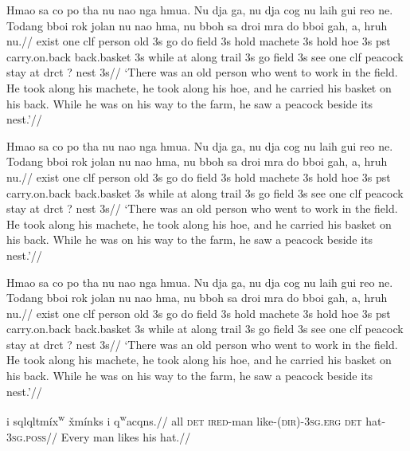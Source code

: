 
\hsize=4in

\raggedbottom
{}


\ex
\begingl
\gla
Hmao sa co po tha  nu nao nga hmua. Nu dja ga, nu dja cog nu laih
gui reo ne. Todang bboi rok jolan nu nao hma, nu bboh sa droi mra
do bboi gah, a, hruh nu.//
\glb
exist one {clf} person old 3s go do field 3s hold machete 3s hold
hoe 3s pst carry.on.back back.basket 3s while at {along} trail 3s
go field 3s see one clf peacock stay at drct {?} nest 3s//
\glft
`There was an old person who went to work in the field. He took
along his machete, he took along his hoe, and he carried his
basket on his back. While he was on his way to the farm, he saw a
peacock beside its nest.'//
\endgl
\xe

\ex
\begingl
\gla
Hmao sa co po tha  nu nao nga hmua. Nu dja ga, nu dja cog nu laih
gui reo ne. Todang bboi rok jolan nu nao hma, nu bboh sa droi mra
do bboi gah, a, hruh nu.//
\glb
exist one {clf} person old 3s go do field 3s hold machete 3s hold
hoe 3s pst carry.on.back back.basket 3s while at {along} trail 3s
go field 3s see one clf peacock stay at drct {?} nest 3s//
\glft
`There was an old person who went to work in the field. He took
along his machete, he took along his hoe, and he carried his
basket on his back. While he was on his way to the farm, he saw a
peacock beside its nest.'//
\endgl
\xe

\ex
\begingl
\gla
Hmao sa co po tha  nu nao nga hmua. Nu dja ga, nu dja cog nu laih
gui reo ne. Todang bboi rok jolan nu nao hma, nu bboh sa droi mra
do bboi gah, a, hruh nu.//
\glb
exist one {clf} person old 3s go do field 3s hold machete 3s hold
hoe 3s pst carry.on.back back.basket 3s while at {along} trail 3s
go field 3s see one clf peacock stay at drct {?} nest 3s//
\glft
`There was an old person who went to work in the field. He took
along his machete, he took along his hoe, and he carried his
basket on his back. While he was on his way to the farm, he saw a
peacock beside its nest.'//
\endgl
\xe




\pex[glhangstyle=cascade]
\a\begingl
{} {i\textglotstop }
{sq\textschwa lq\textschwa ltm\'ix\textsuperscript{w}} {\v{x}m\'inks}
{i\textglotstop } {q\textsuperscript{w}acqns.}//
\glb all \textsc{det} \textsc{ired}-man like-\textsc{(dir)-3sg.erg}
\textsc{det} hat-\textsc{3sg.poss}// \glft Every man likes his hat.//
\endgl

